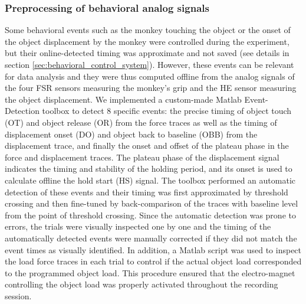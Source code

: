 {\subsubsection{Preprocessing of behavioral analog signals}

Some behavioral events such as the monkey touching the object or the onset of the object displacement by the monkey were controlled during the experiment, but their online-detected timing was approximate and not saved (see details in section \cref{sec:behavioral_control_system}). However, these events can be relevant for data analysis and they were thus computed offline from the analog signals of the four FSR sensors measuring the monkey's grip and the HE sensor measuring the object displacement. We implemented a custom-made Matlab Event-Detection toolbox to detect 8 specific events: the precise timing of object touch (OT) and object release (OR) from the force traces as well as the timing of displacement onset (DO) and object back to baseline (OBB) from the displacement trace, and finally the onset and offset of the plateau phase in the force and displacement traces. The plateau phase of the displacement signal indicates the timing and stability of the holding period, and its onset is used to calculate offline the hold start (HS) signal. The toolbox performed an automatic detection of these events and their timing was first approximated by threshold crossing and then fine-tuned by back-comparison of the traces with baseline level from the point of threshold crossing. Since the automatic detection was prone to errors, the trials were visually inspected one by one and the timing of the automatically detected events were manually corrected if they did not match the event times as visually identified. In addition, a Matlab script was used to inspect the load force traces in each trial to control if the actual object load corresponded to the programmed object load. This procedure ensured that the electro-magnet controlling the object load was properly activated throughout the recording session. 

}
